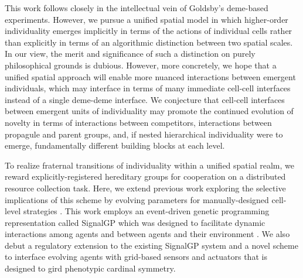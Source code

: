 This work follows closely in the intellectual vein of Goldsby's deme-based experiments.
However, we pursue a unified spatial model in which higher-order individuality emerges implicitly in terms of the actions of individual cells rather than explicitly in terms of an algorithmic distinction between two spatial scales.
In our view, the merit and significance of such a distinction on purely philosophical grounds is dubious.
However, more concretely, we hope that a unified spatial approach will enable more nuanced interactions between emergent individuals, which may interface in terms of many immediate cell-cell interfaces instead of a single deme-deme interface.
We conjecture that cell-cell interfaces between emergent units of individuality may promote the continued evolution of novelty in terms of interactions between competitors, interactions between propagule and parent groups, and, if nested hierarchical individuality were to emerge, fundamentally different building blocks at each level.

To realize fraternal transitions of individuality within a unified spatial realm, we reward explicitly-registered hereditary groups for cooperation on a distributed resource collection task.
Here, we extend previous work exploring the selective implications of this scheme by evolving parameters for manually-designed cell-level strategies \citep{moreno2019toward}.
This work employs an event-driven genetic programming representation called SignalGP which was designed to facilitate dynamic interactions among agents and between agents and their environment \citep{lalejini2018evolving}.
We also debut a regulatory extension to the existing SignalGP system and a novel scheme to interface evolving agents with grid-based sensors and actuators that is designed to gird phenotypic cardinal symmetry.
